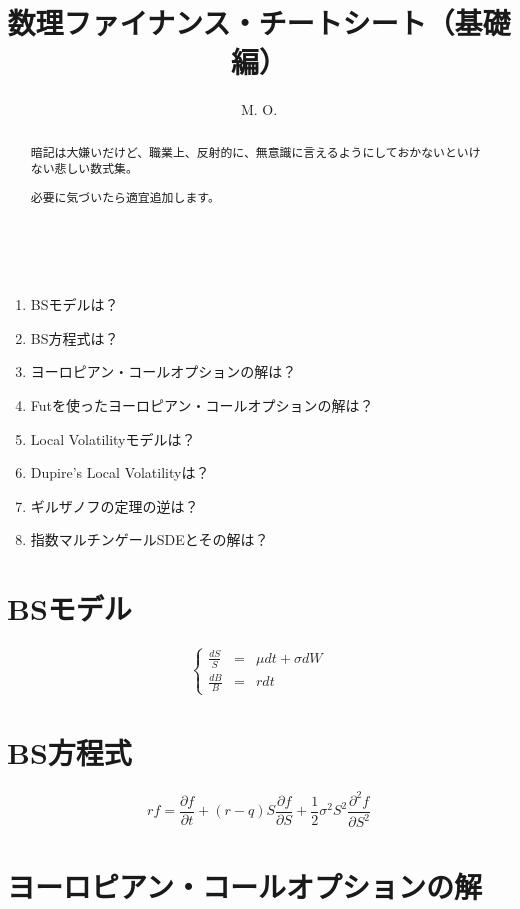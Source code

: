 \documentclass[uplatex]{jsarticle}
\title{
数理ファイナンス・チートシート（基礎編）
}
\author{
M. O.
}
\begin{document}
\maketitle

\begin{abstract}
	暗記は大嫌いだけど、職業上、反射的に、無意識に言えるようにしておかないといけない悲しい数式集。

	必要に気づいたら適宜追加します。
\end{abstract}

\ \\

\begin{enumerate}
	\item BSモデルは？
	\item BS方程式は？
	\item ヨーロピアン・コールオプションの解は？
	\item Futを使ったヨーロピアン・コールオプションの解は？
	\item Local Volatilityモデルは？
	\item Dupire's Local Volatilityは？
	\item ギルザノフの定理の逆は？
	\item 指数マルチンゲールSDEとその解は？
\end{enumerate}

\newpage



\section{BSモデル}

\[
	\left\{
	\begin{array}{rcl}
		\displaystyle \frac{dS}{S} & = & \mu dt + \sigma dW \\
		\displaystyle \frac{dB}{B} & = & r dt
	\end{array}
	\right.
\]

\section{BS方程式}

\[
	rf
	=
	\frac{\partial f}{\partial t}
	+
	(r-q) S \frac{\partial f}{\partial S}
	+
	\frac{1}{2} \sigma^{2} S^{2}
	\frac{\partial^{2} f}{\partial S^{2}}
\]


\section{ヨーロピアン・コールオプションの解}
\end{document}
